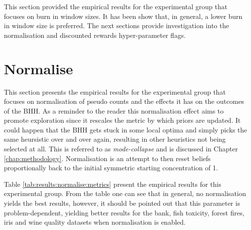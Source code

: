 This section provided the empirical results for the experimental group that focuses on burn in window sizes. It has been show that, in general, a lower burn in window size is preferred. The next sections provide investigation into the normalisation and discounted rewards hyper-parameter flags.




\section{Normalise}
\label{sec:results:normalise}

This section presents the empirical results for the experimental group that focuses on normalisation of pseudo counts and the effects it has on the outcomes of the \Ac{BHH}. As a reminder to the reader this normalisation effect aims to promote exploration since it rescales the metric by which priors are updated. It could happen that the \Ac{BHH} gets stuck in some local optima and simply picks the same heursistic over and over again, resulting in other heuristics not being selected at all. This is referred to as \textit{mode-collapse} and is discussed in Chapter \ref{chap:methodology}. Normalisation is an attempt to then reset beliefs proportionally back to the initial symmetric starting concentration of 1.

Table \ref{tab:results:normalise:metrics} present the empirical results for this experimental group. From the table one can see that in general, no normalisation yields the best results, however, it should be pointed out that this parameter is problem-dependent, yielding better results for the bank, fish toxicity, forest fires, iris and wine quality datasets when normalisation is enabled.


